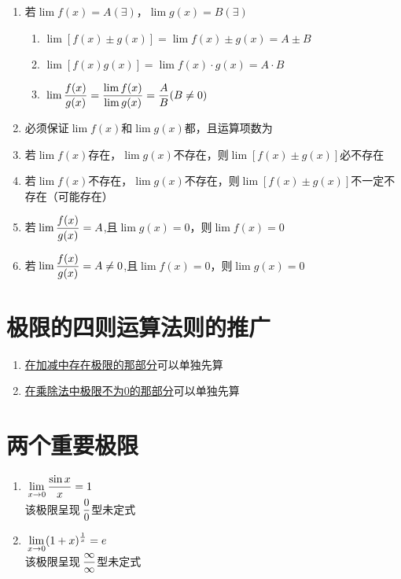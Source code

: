 \begin{enumerate}
    \item 若$\lim f(x)=A (\exists)$，$\lim g(x)=B (\exists)$
    \begin{enumerate}
        \item $\lim [f(x)\pm g(x)]=\lim f(x)\pm g(x)=A\pm B$
        \item $\lim [f(x)g(x)]=\lim f(x)\cdot g(x)=A \cdot B$
        \item $\displaystyle\hspace{.2em}\lim \frac{f(x)}{g(x)}=\frac{\lim f(x)}{\lim g(x)}=\frac{A}{B}(B\ne 0)$
    \end{enumerate}
    \item 必须保证$\lim f(x)$和$\lim g(x)$都，且运算项数为
    \item 若$\lim f(x)$存在，$\lim g(x)$不存在，则$\lim [f(x)\pm g(x)]$必不存在
    \item 若$\lim f(x)$不存在，$\lim g(x)$不存在，则$\lim [f(x)\pm g(x)]$不一定不存在（可能存在）
    \item 若$\displaystyle\hspace{.2em}\lim \frac{f(x)}{g(x)}=A$,且$\lim g(x)=0$，则$\lim f(x)=0$ 
    \item 若$\displaystyle\hspace{.2em}\lim \frac{f(x)}{g(x)}=A\ne 0$,且$\lim f(x)=0$，则$\lim g(x)=0$ 
\end{enumerate}

\section{极限的四则运算法则的推广}

\begin{enumerate}
    \item \underline{在加减中存在极限的那部分}可以单独先算
    \item \underline{在乘除法中极限不为0的那部分}可以单独先算
\end{enumerate}

\section{两个重要极限}

\begin{enumerate}
    \item {$\displaystyle\hspace{.2em}\lim \limits_{x\to 0}\frac{\sin x}{x}=1$\\
    该极限呈现$\displaystyle\hspace{.2em}\frac{0}{0}$型未定式}
    \item {$\displaystyle\hspace{.2em}\lim \limits_{x\to 0}(1+x)^{\frac{1}{x}}=e$\\
    该极限呈现$\displaystyle\hspace{.2em}\frac{\infty}{\infty}$型未定式}
\end{enumerate}

